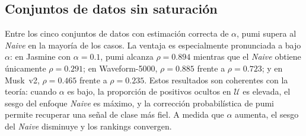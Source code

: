 \begin{table}[ht]
\centering
\caption{Correlación de Spearman.}
\label{tab:spearman_summary}
\small
{}
\end{table}

\subsection{Conjuntos de datos sin saturación}
\label{subsec:rankings_no_saturados}

Entre los cinco conjuntos de datos con estimación correcta de $\alpha$, \acrshort{pumi} supera al \textit{Naive} en la mayoría de los casos. La ventaja es especialmente pronunciada a bajo $\alpha$: en Jasmine con $\alpha=0.1$, \acrshort{pumi} alcanza $\rho=0.894$ mientras que el \textit{Naive} obtiene únicamente $\rho=0.291$; en Waveform-5000, $\rho=0.885$ frente a $\rho=0.723$; y en Musk~v2, $\rho=0.465$ frente a $\rho=0.235$. Estos resultados son coherentes con la teoría: cuando $\alpha$ es bajo, la proporción de positivos ocultos en $\mathcal{U}$ es elevada, el sesgo del enfoque \textit{Naive} es máximo, y la corrección probabilística de \acrshort{pumi} permite recuperar una señal de clase más fiel. A medida que $\alpha$ aumenta, el sesgo del \textit{Naive} disminuye y los rankings convergen.

